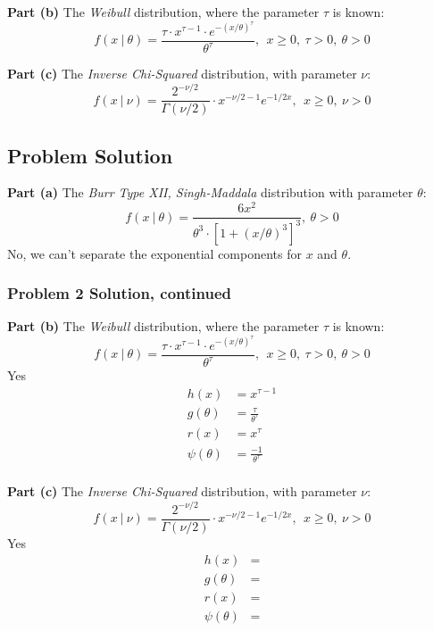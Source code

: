 \documentclass[12pt]{article}
\theoremstyle{definition}
\begin{document}
\bigskip
\noindent
{\bf Part (b)} The {\em Weibull} distribution, where the parameter $\tau$ is known:
$$
f(x\ |\ \theta) = \frac{ \tau \cdot x^{\tau - 1} \cdot e^{-(x/\theta)^\tau}}{\theta^\tau},\ \ x \geq 0,\ \tau > 0,\ \theta > 0
$$



\bigskip
\noindent
{\bf Part (c)} The {\em Inverse Chi-Squared} distribution, with parameter $\nu$:
$$
f(x\ |\ \nu) = \frac{ 2^{-\nu/2} }{\Gamma( \nu / 2)} \cdot x^{-\nu/2 - 1} e^{-1/2x},\ \ x \geq 0,\ \nu > 0
$$


\subsection*{Problem Solution}

\noindent
{\bf Part (a)} The {\em Burr Type XII, Singh-Maddala} distribution with parameter $\theta$:
$$
f(x\ |\ \theta) = \frac{ 6 x^2 }{\theta^3 \cdot [1 + (x/\theta)^3]^3},\ \theta > 0
$$
No, we can't separate the exponential components for $x$ and $\theta$.
\bigskip

\newpage
\subsubsection*{Problem 2 Solution, continued}

\noindent
{\bf Part (b)} The {\em Weibull} distribution, where the parameter $\tau$ is known:
$$
f(x\ |\ \theta) = \frac{ \tau \cdot x^{\tau - 1} \cdot e^{-(x/\theta)^\tau}}{\theta^\tau},\ \ x \geq 0,\ \tau > 0,\ \theta > 0
$$
Yes
\begin{align*}
h(x) &= x^{\tau - 1}\\
g(\theta) &= \frac{\tau}{\theta^\tau}\\
r(x) &= x^\tau\\
\psi(\theta) &= \frac{{-1}}{\theta^\tau}\\
\end{align*}


\vspace{3in}
\noindent
{\bf Part (c)} The {\em Inverse Chi-Squared} distribution, with parameter $\nu$:
$$
f(x\ |\ \nu) = \frac{ 2^{-\nu/2} }{\Gamma( \nu / 2)} \cdot x^{-\nu/2 - 1} e^{-1/2x},\ \ x \geq 0,\ \nu > 0
$$
Yes
\begin{align*}
h(x) &= \\
g(\theta) &= \\
r(x) &= \\
\psi(\theta) &= \\
\end{align*}
\end{document}
